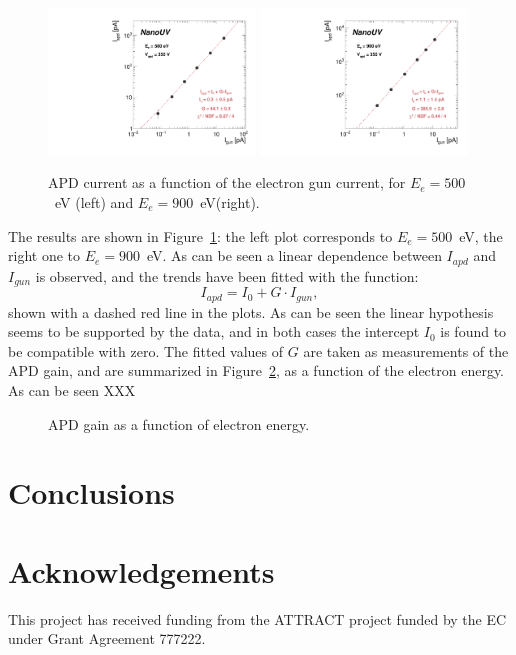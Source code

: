 \documentclass[12p]{paper}
\begin{document}
\begin{figure}[htb]
  \centering
  \includegraphics[width=0.49\textwidth]{figures/iapd_vs_igun_E500_V350}
  \includegraphics[width=0.49\textwidth]{figures/iapd_vs_igun_E900_V350}
 \caption{APD current as a function of the electron gun current, for $E_{e} = 500$~eV (left) and $E_{e} = 900$~eV(right).
  \label{fig:i_vs_i}}
\end{figure}

The results are shown in Figure~\ref{fig:i_vs_i}: the left plot corresponds to $E_{e} = 500$~eV, the right one to $E_{e} = 900$~eV. As can be seen a linear dependence between $I_{apd}$ and $I_{gun}$ is observed, and the trends have been fitted with the function:
$$
I_{apd} = I_0 + G\cdot I_{gun},
$$
shown with a dashed red line in the plots. As can be seen the linear hypothesis seems to be supported by the data, and in both cases the intercept $I_0$ is found to be compatible with zero. The fitted values of $G$ are taken as measurements of the APD gain, and are summarized in Figure~\ref{fig:G_vs_E}, as a function of the electron energy. As can be seen XXX

\begin{figure}[tb]
  \centering
 \caption{APD gain as a function of electron energy.
  \label{fig:G_vs_E}}
\end{figure}




\section{Conclusions}

\section*{Acknowledgements}

This project has received funding from the ATTRACT project funded by the EC under Grant Agreement 777222.
\end{document}
